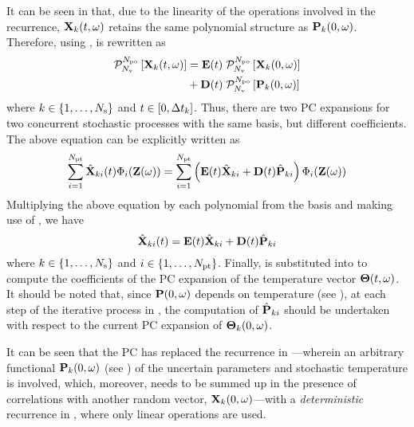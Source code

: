 It can be seen in  that, due to the linearity of the operations involved in the recurrence, $\mathbf{X}_k(t, \omega)$ retains the same polynomial structure as $\mathbf{P}_k(0, \omega)$. Therefore, using ,  is rewritten as
\begin{align*}
  \oPC{\vars}{\pcorder}{\vX_k(\t, \o)} & = \mE(\t) \; \oPC{\vars}{\pcorder}{\vX_k(0, \o)} \\
  & {} + \mD(\t) \; \oPC{\vars}{\pcorder}{\vP_k(0, \o)}
\end{align*}
where $k \in \{ 1, \dotsc, N_\text{s} \}$ and $t \in [0, \Delta t_k]$. Thus, there are two PC expansions for two concurrent stochastic processes with the same basis, but different coefficients. The above equation can be explicitly written as
\[
  \sum_{i = 1}^{\pcterms} \pcc{\vX}_{ki}(\t) \pcb_i(\vZ(\o)) = \sum_{i = 1}^{\pcterms} \left( \mE(\t) \pcc{\vX}_{ki} + \mD(\t) \pcc{\vP}_{ki} \right) \pcb_i(\vZ(\o))
\]
Multiplying the above equation by each polynomial from the basis and making use of , we have
\begin{equation} \elabel{pc-recurrence}
  \pcc{\vX}_{ki}(\t) = \mE(\t) \pcc{\vX}_{ki} + \mD(\t) \pcc{\vP}_{ki}
\end{equation}
where $k \in \{ 1, \dots, N_\text{s} \}$ and $i \in \{ 1, \dotsc, {N_\text{pt}} \}$. Finally,  is substituted into  to compute the coefficients of the PC expansion of the temperature vector ${\boldsymbol\Theta}(t, \omega)$. It should be noted that, since $\mathbf{P}(0, \omega)$ depends on temperature (see ), at each step of the iterative process in , the computation of $\hat{\mathbf{P}}_{ki}$ should be undertaken with respect to the current PC expansion of ${\boldsymbol\Theta}_k(0, \omega)$.

It can be seen that the PC has replaced the recurrence in ---wherein an arbitrary functional $\mathbf{P}_k(0, \omega)$ (see ) of the uncertain parameters and stochastic temperature is involved, which, moreover, needs to be summed up in the presence of correlations with another random vector, $\mathbf{X}_k(0, \omega)$---with a \emph{deterministic} recurrence in , where only linear operations are used.
